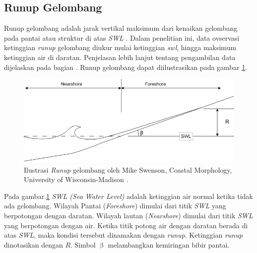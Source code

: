 

\subsection{Runup Gelombang}
Runup gelombang adalah jarak vertikal maksimum dari kenaikan gelombang pada pantai atau struktur di atas \emph{SWL} \cite{sorensen2005basic}. Dalam penelitian ini, data ovservasi ketinggian \emph{runup} gelombang diukur mulai ketinggian \emph{swl}, hingga maksimum ketinggian air di daratan. Penjelasan lebih lanjut tentang pengambilan data dijelaskan pada bagian . Runup gelombang dapat diilustrasikan pada gambar \ref{fig:runup}.
\begin{figure}[h]
    \begin{center}
        \includegraphics[scale=0.7]{./images/runup_gelombang.jpg}
    \end{center}
    \caption{Ilustrasi \emph{Runup} gelombang oleh Mike Swenson, Coastal Morphology, University of Wisconsin-Madison \cite{MikeSwenson:WaveRunup}.}
    \label{fig:runup}
\end{figure}
\FloatBarrier
Pada gambar.\ref{fig:runup} \emph{SWL (Sea Water Level)} adalah ketinggian air normal ketika tidak ada gelombang. Wilayah Pantai (\emph{Foreshore}) dimulai dari titik \emph{SWL} yang berpotongan dengan daratan. Wilayah lautan (\emph{Nearshore}) dimulai dari titik \emph{SWL} yang berpotongan dengan air. Ketika titik potong air dengan daratan berada di atas \emph{SWL}, maka kondisi tersebut dinamakan dengan \emph{runup}. Ketinggian \emph{runup} dinotasikan dengan $R$. Simbol $\upbeta$ melambangkan kemiringan bibir pantai.

